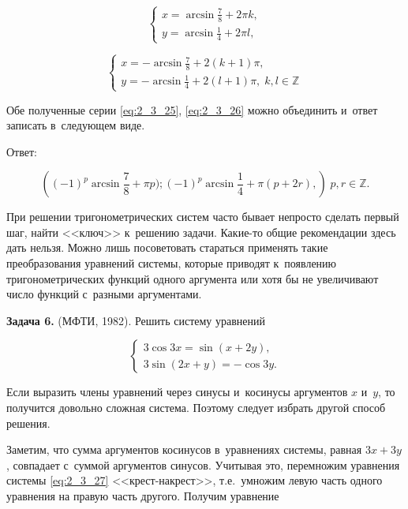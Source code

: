 \begin{equation}\label{eq:2_3_25}
\begin{cases}
\displaystyle x = \arcsin \frac{7}{8} + 2 \pi k, \\[10pt] 
\displaystyle y = \arcsin \frac{1}{4} + 2 \pi l,
\end{cases}
\end{equation}

\begin{equation}\label{eq:2_3_26}
\begin{cases}
\displaystyle x = -\arcsin \frac{7}{8} + 2(k + 1) \pi, \\[10pt]
\displaystyle y = - \arcsin \frac{1}{4} + 2(l + 1) \pi, \; k, l \in \mathbb{Z}
\end{cases}
\end{equation}

Обе полученные серии \eqref{eq:2_3_25}, \eqref{eq:2_3_26} можно объединить
и~ответ записать в~следующем виде.

Ответ:

\begin{equation*}
\displaystyle
\left(
(-1)^{p} \arcsin \frac{7}{8} + \pi p);
(-1)^{p} \arcsin \frac{1}{4} + \pi (p + 2r),
\right)
\; p, r \in \mathbb{Z}.
\end{equation*}

При решении тригонометрических систем часто бывает непросто сделать первый шаг,
найти <<ключ>> к~решению задачи.
Какие-то общие рекомендации здесь дать нельзя.
Можно лишь посоветовать стараться применять такие преобразования уравнений системы,
которые приводят к~появлению тригонометрических функций одного аргумента или
хотя бы не увеличивают число функций с~разными аргументами.

\textbf{Задача 6.}\label{ex:2_3_6} (МФТИ, 1982). Решить систему уравнений

\begin{equation}\label{eq:2_3_27}
\begin{cases}
3 \cos 3x = \sin (x + 2y), \\
3 \sin (2x + y) = - \cos 3y.
\end{cases}
\end{equation}

Если выразить члены уравнений через синусы и~косинусы аргументов $x$ и~$y$,
то получится довольно сложная система. Поэтому следует избрать другой способ
решения.

Заметим, что сумма аргументов косинусов в~уравнениях системы, равная $3x + 3y$,
совпадает с~суммой аргументов синусов. Учитывая это, перемножим уравнения системы
\eqref{eq:2_3_27} <<крест-накрест>>, т.е.\ умножим левую часть одного уравнения
на правую часть другого. Получим уравнение

